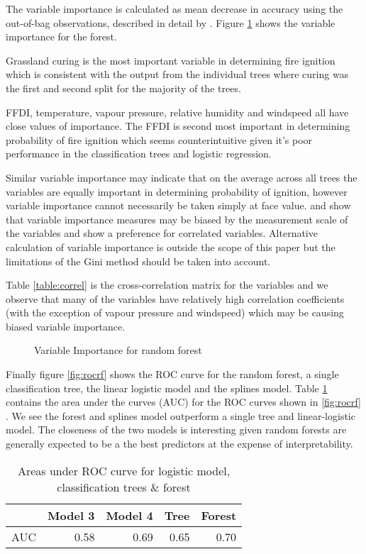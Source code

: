 \documentclass[11pt,a4paper]{article}
\begin{document}
The variable importance is calculated as mean decrease in accuracy using the out-of-bag observations, described in detail by \cite{archer08}. Figure \ref{fig:vimp} shows the variable importance for the forest. 

Grassland curing is the most important variable in determining fire ignition which is consistent with the output from the individual trees where curing was the first and second split for the majority of the trees. 

FFDI, temperature, vapour pressure, relative humidity and windspeed all have close values of importance. The FFDI is second most important in determining probability of fire ignition which seems counterintuitive given it's poor performance in the classification trees and logistic regression. 

Similar variable importance may indicate that on the average across all trees the variables are equally important in determining probability of ignition, however variable importance cannot necessarily be taken simply at face value. \cite{strob07}  and \cite{strob08} show that variable importance measures may be biased by the measurement scale of the variables and show a preference for correlated variables. Alternative calculation of variable importance is outside the scope of this paper but the limitations of the Gini method should be taken into account. 

Table \ref{table:correl} is the cross-correlation matrix for the variables and we observe that many of the variables have relatively high correlation coefficients (with the exception of vapour pressure and windspeed) which may be causing biased variable importance. 


\begin{figure}[!ht]
	\centering 
	\caption{Variable Importance for random forest} 
	\label{fig:vimp} 
\end{figure}

Finally figure \ref{fig:rocrf} shows the ROC curve for the random forest, a single classification tree, the linear logistic model and the splines model. Table \ref{table:AUC} contains the area under the curves (AUC) for the ROC curves shown in \ref{fig:rocrf} . We see the forest and splines model outperform a single tree and linear-logistic model. The closeness of the two models is interesting given random forests are generally expected to be a the best predictors at the expense of interpretability. 

\begin{table}[!ht]
	\centering
	\begin{tabular}{r|rrrr}
		\toprule
		& Model 3 & Model 4 & Tree & Forest \\ 
		\midrule
		AUC & 0.58 & 0.69 & 0.65 & 0.70 \\ 
		\midrule
	\end{tabular}
	\caption{Areas under ROC curve for logistic model, classification trees \& forest}
	\label{table:AUC}
\end{table}
\end{document}
